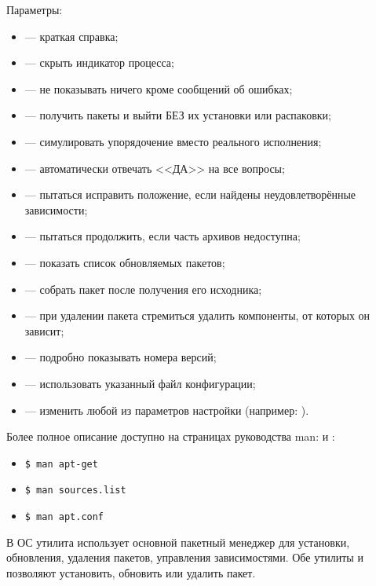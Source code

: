 Параметры:
\begin{itemize}
	\item {} --- краткая справка;
	\item {} --- скрыть индикатор процесса;
	\item {}--- не показывать ничего кроме сообщений об ошибках;
	\item {} --- получить пакеты и выйти БЕЗ их установки или распаковки;
	\item {} --- симулировать упорядочение вместо реального исполнения;
	\item {} --- автоматически отвечать <<ДА>> на все вопросы;
	\item {} --- пытаться исправить положение, если найдены неудовлетворённые зависимости;
	\item {} --- пытаться продолжить, если часть архивов недоступна;
	\item {} --- показать список обновляемых пакетов;
	\item {} --- собрать пакет после получения его исходника;
	\item {} --- при удалении пакета стремиться удалить компоненты, от которых он зависит;
	\item {} --- подробно показывать номера версий;
	\item {} --- использовать указанный файл конфигурации;
	\item {} --- изменить любой из параметров настройки (например: ).
\end{itemize}

Более полное описание доступно на страницах руководства man:
 и :
\begin{itemize}
	\item\begin{verbatim}$ man apt-get\end{verbatim}
	\item\begin{verbatim}$ man sources.list\end{verbatim}
	\item\begin{verbatim}$ man apt.conf\end{verbatim}
\end{itemize}

В ОС  утилита  использует основной пакетный менеджер  для установки, обновления, удаления пакетов, управления зависимостями. Обе
утилиты  и  позволяют установить, обновить или удалить пакет.

